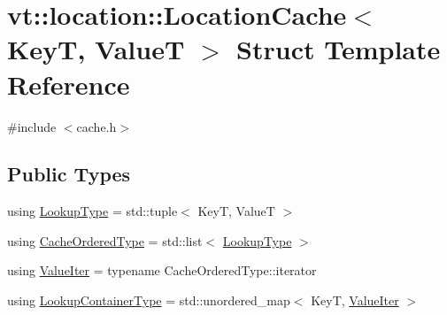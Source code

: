 \hypertarget{structvt_1_1location_1_1_location_cache}{}\section{vt\+:\+:location\+:\+:Location\+Cache$<$ KeyT, ValueT $>$ Struct Template Reference}
\label{structvt_1_1location_1_1_location_cache}


{\ttfamily \#include $<$cache.\+h$>$}

\subsection*{Public Types}
\begin{DoxyCompactItemize}
\item 
using \hyperlink{structvt_1_1location_1_1_location_cache_a8a5ea74b02aaaa77820bf2504bda1175}{Lookup\+Type} = std\+::tuple$<$ KeyT, ValueT $>$
\item 
using \hyperlink{structvt_1_1location_1_1_location_cache_aee11ea8af838d172e1834a9d0293b28d}{Cache\+Ordered\+Type} = std\+::list$<$ \hyperlink{structvt_1_1location_1_1_location_cache_a8a5ea74b02aaaa77820bf2504bda1175}{Lookup\+Type} $>$
\item 
using \hyperlink{structvt_1_1location_1_1_location_cache_a67dc1e71785f1c8aa3b1e02d802977b8}{Value\+Iter} = typename Cache\+Ordered\+Type\+::iterator
\item 
using \hyperlink{structvt_1_1location_1_1_location_cache_af56948d938dcc38705b777a96b3100be}{Lookup\+Container\+Type} = std\+::unordered\+\_\+map$<$ KeyT, \hyperlink{structvt_1_1location_1_1_location_cache_a67dc1e71785f1c8aa3b1e02d802977b8}{Value\+Iter} $>$
\end{DoxyCompactItemize}
